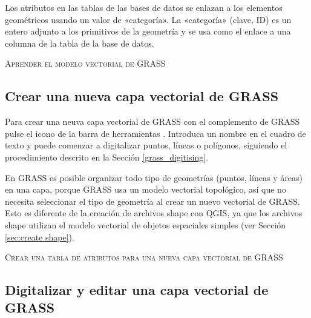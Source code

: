 Los atributos en las tablas de las bases de datos se enlazan a los elementos geométricos usando un valor de «categoría».
 La «categoría» (clave, ID) es un entero adjunto a los primitivos de la geometría y se 
usa como el enlace a una columna de la tabla de la base de datos.

\begin{Tip}\caption{\textsc{Aprender el modelo vectorial de GRASS}}
\end{Tip} 

\subsection{Crear una nueva capa vectorial de GRASS}\label{sec:creating_new_grass_vectors}

Para crear una neuva capa vectorial de GRASS con el complemento de GRASS pulse el icono de la barra de herramientas 
. Introduca un nombre en el cuadro de texto y puede comenzar 
a digitalizar puntos, líneas o polígonos, siguiendo el procedimiento descrito en la Sección 
\ref{grass_digitising}. 

En GRASS es posible organizar todo tipo de geometrías (puntos, líneas y áreas) en una capa, porque GRASS usa un modelo
vectorial topológico, así que no necesita seleccionar el tipo de geometría al crear un nuevo vectorial de GRASS. Esto es
diferente de la creación de archivos shape con QGIS, ya que los archivos shape utilizan el modelo vectorial de objetos 
espaciales simples (ver Sección \ref{sec:create shape}).

\begin{Tip}\caption{\textsc{Crear una tabla de atributos para una nueva capa vectorial de GRASS}}
\end{Tip} 

\subsection{Digitalizar y editar una capa vectorial de GRASS}\label{grass_digitising}

